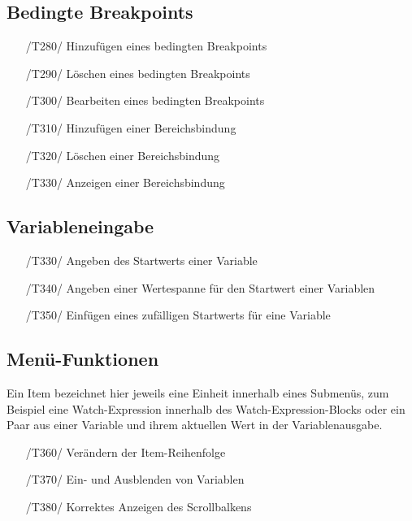 \documentclass[parskip=full]{scrartcl}
\begin{document}
\subsection{Bedingte Breakpoints}

\begin{itemize}

	\item[/T280/] Hinzufügen eines bedingten Breakpoints
	\item[/T290/] Löschen eines bedingten Breakpoints
	\item[/T300/] Bearbeiten eines bedingten Breakpoints
	\item[/T310/] Hinzufügen einer Bereichsbindung
	\item[/T320/] Löschen einer Bereichsbindung
	\item[/T330/] Anzeigen einer Bereichsbindung
		
\end{itemize}

\newpage
\subsection{Variableneingabe}



\begin{itemize}

\item[/T330/] Angeben des Startwerts einer Variable
\item[/T340/] Angeben einer Wertespanne für den Startwert einer Variablen
\item[/T350/] Einfügen eines zufälligen Startwerts für eine Variable
\end{itemize}

\subsection{Menü-Funktionen}

Ein Item bezeichnet hier jeweils eine Einheit innerhalb eines Submenüs, zum Beispiel eine Watch-Expression innerhalb des Watch-Expression-Blocks oder ein Paar aus einer Variable und ihrem aktuellen Wert in der Variablenausgabe.

\begin{itemize}

	\item[/T360/] Verändern der Item-Reihenfolge
	\item[/T370/] Ein- und Ausblenden von Variablen
	\item[/T380/] Korrektes Anzeigen des Scrollbalkens
\end{itemize}
\end{document}
